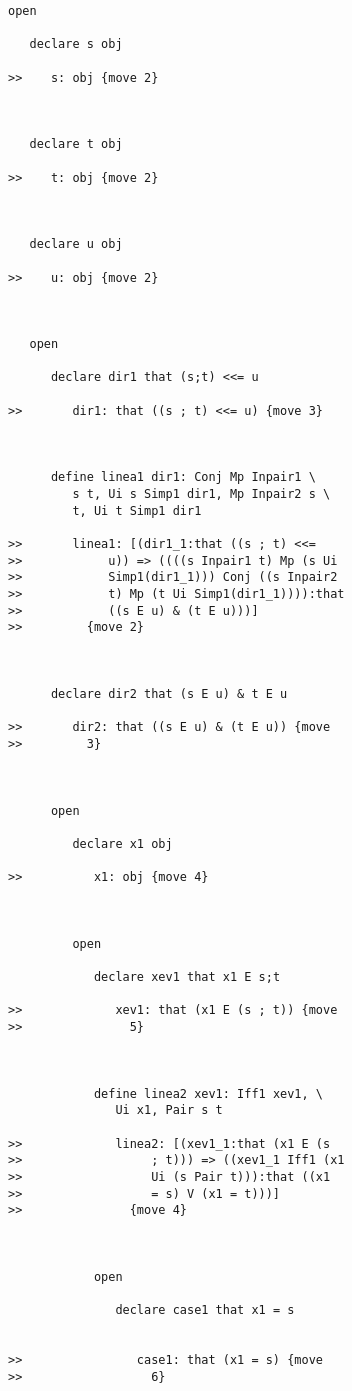 \documentclass[12pt]{article}
\begin{document}
\begin{verbatim}
open

   declare s obj

>>    s: obj {move 2}



   declare t obj

>>    t: obj {move 2}



   declare u obj

>>    u: obj {move 2}



   open

      declare dir1 that (s;t) <<= u

>>       dir1: that ((s ; t) <<= u) {move 3}



      define linea1 dir1: Conj Mp Inpair1 \
         s t, Ui s Simp1 dir1, Mp Inpair2 s \
         t, Ui t Simp1 dir1

>>       linea1: [(dir1_1:that ((s ; t) <<=
>>            u)) => ((((s Inpair1 t) Mp (s Ui
>>            Simp1(dir1_1))) Conj ((s Inpair2
>>            t) Mp (t Ui Simp1(dir1_1)))):that
>>            ((s E u) & (t E u)))]
>>         {move 2}



      declare dir2 that (s E u) & t E u

>>       dir2: that ((s E u) & (t E u)) {move
>>         3}



      open

         declare x1 obj

>>          x1: obj {move 4}



         open

            declare xev1 that x1 E s;t

>>             xev1: that (x1 E (s ; t)) {move
>>               5}



            define linea2 xev1: Iff1 xev1, \
               Ui x1, Pair s t

>>             linea2: [(xev1_1:that (x1 E (s
>>                  ; t))) => ((xev1_1 Iff1 (x1
>>                  Ui (s Pair t))):that ((x1
>>                  = s) V (x1 = t)))]
>>               {move 4}



            open

               declare case1 that x1 = s


>>                case1: that (x1 = s) {move
>>                  6}




\end{verbatim}
\end{document}
